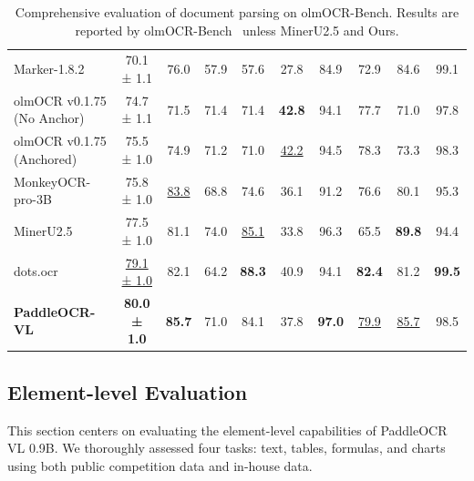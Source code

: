 \documentclass[11pt, a4paper,logo,  copyright, nonumbering]{paddleocr}
\begin{document}
\begin{table}[h]
{\begin{tabular}{l|c|cccccccc}
    Marker-1.8.2~\cite{vik2024marker}&70.1 ± 1.1  & 76.0 & 57.9 & 57.6 & 27.8 & 84.9 & 72.9 & 84.6 & 99.1  \\
    
    olmOCR v0.1.75 (No Anchor)~\cite{poznanski2025olmocr}& 74.7 ± 1.1  & 71.5 & 71.4 & 71.4 & \cellcolor{red!15}\textbf {42.8} & 94.1 & 77.7 & 71.0 & 97.8 \\
    
    olmOCR v0.1.75 (Anchored)~\cite{poznanski2025olmocr}& 75.5 ± 1.0  & 74.9 & 71.2 & 71.0 & \cellcolor{cyan!15}\underline{42.2} & 94.5 & 78.3 & 73.3 & 98.3  \\
    
    MonkeyOCR-pro-3B~\cite{li2025monkeyocr}& 75.8 ± 1.0  & \cellcolor{cyan!15}\underline{83.8} & 68.8 & 74.6 & 36.1 & 91.2 & 76.6 & 80.1 & 95.3 \\
    
    MinerU2.5~\cite{niu2025mineru2} & 77.5 ± 1.0 & 81.1 & 74.0 & \cellcolor{cyan!15}\underline{85.1} & 33.8 & 96.3 & 65.5 & \cellcolor{red!15}\textbf{89.8} & 94.4 \\
    dots.ocr~\cite{dotsocr} & \cellcolor{cyan!15}\underline{79.1 ± 1.0} & 82.1 & 64.2 & \cellcolor{red!15}\textbf {88.3} & 40.9 & 94.1 & \cellcolor{red!15}\textbf {82.4} & 81.2 & \cellcolor{red!15}\textbf {99.5} \\
    
     \textbf{PaddleOCR-VL}&\cellcolor{red!15}\textbf {80.0 ± 1.0} & \cellcolor{red!15}\textbf { 85.7} & 71.0 & 84.1 & 37.8 & \cellcolor{red!15}\textbf{97.0} & \cellcolor{cyan!15}\underline{79.9} & \cellcolor{cyan!15}\underline{85.7} & 98.5  \\
    \bottomrule
  \end{tabular}
  }
    \caption{Comprehensive evaluation of document parsing on olmOCR-Bench. Results are reported by olmOCR-Bench~\cite{poznanski2025olmocr} unless MinerU2.5 and Ours.}
     \label{tab:ocr_performance}
\end{table}



\subsection{Element-level Evaluation}
\label{subsec:element_level_evaluation}


This section centers on evaluating the element-level capabilities of PaddleOCR VL 0.9B. We thoroughly assessed four tasks: text, tables, formulas, and charts using both public competition data and in-house data.
\end{document}
